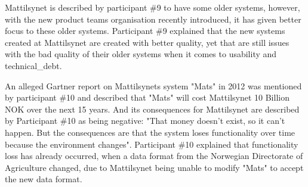 
Mattilsynet is described by participant \#9 to have some older systems, however, with the new product teams organisation recently introduced, it has given better focus to these older systems. Participant \#9 explained that the new systems created at Mattilsynet are created with better quality, yet that are still issues with the bad quality of their older systems when it comes to usability and \gls{technical_debt}.



An alleged Gartner report on Mattilsynets system "Mats" in 2012 was mentioned by participant \#10 and described that "Mats" will cost Mattilsynet 10 Billion NOK over the next 15 years. And its consequences for Mattilsynet are described by Participant \#10 as being negative: "That money doesn't exist, so it can't happen. But the consequences are that the system loses functionality over time because the environment changes". Participant \#10 explained that functionality loss has already occurred, when a data format from the Norwegian Directorate of Agriculture changed, due to Mattilsynet being unable to modify "Mats" to accept the new data format.



